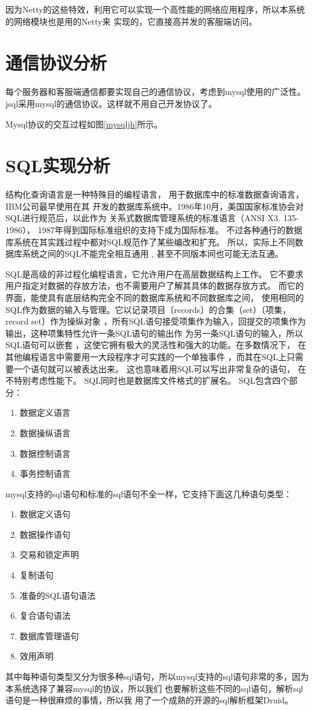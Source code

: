 因为Netty的这些特效，利用它可以实现一个高性能的网络应用程序，所以本系统的网络模块也是用的Netty来
实现的，它直接高并发的客服端访问。
\section{通信协议分析}
每个服务器和客服端通信都要实现自己的通信协议，考虑到mysql使用的广泛性。jsql采用mysql的通信协议。这样就不用自己开发协议了。

Mysql协议的交互过程如图\ref{mysqljh}所示。
\section{SQL实现分析}
结构化查询语言是一种特殊目的编程语言，
用于数据库中的标准数据查询语言，IBM公司最早使用在其
开发的数据库系统中。1986年10月，美国国家标准协会对SQL进行规范后，以此作为
关系式数据库管理系统的标准语言（ANSI X3. 135-1986），
1987年得到国际标准组织的支持下成为国际标准。
不过各种通行的数据库系统在其实践过程中都对SQL规范作了某些编改和扩充。
所以，实际上不同数据库系统之间的SQL不能完全相互通用 ,
 甚至不同版本间也可能无法互通。

SQL是高级的非过程化编程语言，它允许用户在高层数据结构上工作。
它不要求用户指定对数据的存放方法，也不需要用户了解其具体的数据存放方式。
而它的界面，能使具有底层结构完全不同的数据库系统和不同数据库之间，
使用相同的SQL作为数据的输入与管理。它以记录项目〔records〕的合集（set）〔项集，record set〕作为操纵对象
，所有SQL语句接受项集作为输入，回提交的项集作为输出，这种项集特性允许一条SQL语句的输出作
为另一条SQL语句的输入，所以SQL语句可以嵌套
，这使它拥有极大的灵活性和强大的功能。在多数情况下，
在其他编程语言中需要用一大段程序才可实践的一个单独事件
，而其在SQL上只需要一个语句就可以被表达出来。
这也意味着用SQL可以写出非常复杂的语句，
在不特别考虑性能下。
SQL同时也是数据库文件格式的扩展名。
SQL包含四个部分：

\begin{enumerate}
	\item 数据定义语言
\item 数据操纵语言
\item 数据控制语言
\item 事务控制语言
\end{enumerate}

mysql支持的sql语句和标准的sql语句不全一样，它支持下面这几种语句类型：

\begin{enumerate}
	\item 数据定义语句     
\item 数据操作语句     
\item 交易和锁定声明     
\item 复制语句     
\item 准备的SQL语句语法     
\item 复合语句语法     
\item 数据库管理语句     
\item 效用声明  
\end{enumerate}   
其中每种语句类型又分为很多种sql语句，所以mysql支持的sql语句非常的多，因为本系统选择了兼容mysql的协议，所以我们
也要解析这些不同的sql语句，解析sql语句是一种很麻烦的事情，所以我
用了一个成熟的开源的sql解析框架Druid。

